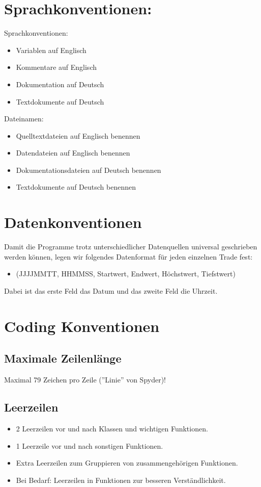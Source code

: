 \documentclass[11pt]{scrartcl}
\begin{document}
	\section{Sprachkonventionen:}
		Sprachkonventionen:
		\begin{itemize}
			\item Variablen auf Englisch
			\item Kommentare auf Englisch
			\item Dokumentation auf Deutsch
			\item Textdokumente auf Deutsch
		\end{itemize}
		Dateinamen:
		\begin{itemize}
			\item Quelltextdateien auf Englisch benennen
			\item Datendateien auf Englisch benennen
			\item Dokumentationsdateien auf Deutsch benennen
			\item Textdokumente auf Deutsch benennen
		\end{itemize}
	\section{Datenkonventionen}
		Damit die Programme trotz unterschiedlicher Datenquellen universal geschrieben werden können, legen wir folgendes Datenformat f\"ur jeden einzelnen Trade fest:
		\begin{itemize}
			\item[] (JJJJMMTT, HHMMSS, Startwert, Endwert, Höchstwert, Tiefstwert)
		\end{itemize}
		Dabei ist das erste Feld das Datum und das zweite Feld die Uhrzeit.
	\section{Coding Konventionen}
		\subsection{Maximale Zeilenlänge}
			Maximal 79 Zeichen pro Zeile (''Linie'' von Spyder)!
		\subsection{Leerzeilen}
			\begin{itemize}
				\item[] 2 Leerzeilen vor und nach Klassen und wichtigen Funktionen.
				\item[] 1 Leerzeile vor und nach sonstigen Funktionen.
				\item[] Extra Leerzeilen zum Gruppieren von zusammengeh\"origen Funktionen.
				\item[] Bei Bedarf: Leerzeilen in Funktionen zur besseren Verst\"andlichkeit.
			\end{itemize}
\end{document}
